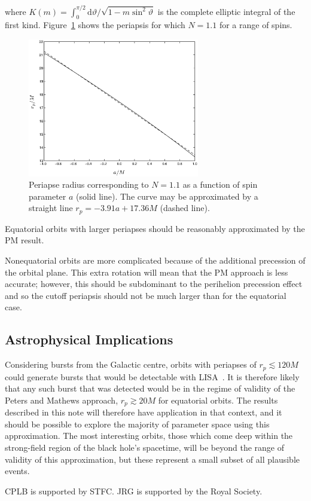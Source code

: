 \documentclass[aps,prd,amsfonts,amssymb,amsmath,nofootinbib,floatfix,reprint,showpacs,groupedaddress]{revtex4-1}
\newcommand{\Figref}[1]{Figure~\ref{fig:#1}}
\newcommand{\dd}{\ensuremath{\mathrm{d}}}
\begin{document}
where $K(m) = \int_{0}^{\pi/2}{\dd\vartheta/\sqrt{1-m\sin^2\vartheta}}$ is the complete elliptic integral of the first kind. \Figref{N_peri} shows the periapsis for which $N = 1.1$ for a range of spins.
\begin{figure}
\includegraphics[width=75mm]{N_peri_3.eps}
\caption{Periapse radius corresponding to $N = 1.1$ as a function of spin parameter $a$ (solid line). The curve may be approximated by a straight line $r_{p} = -3.91 a + 17.36M$ (dashed line).\label{fig:N_peri}}
\end{figure}
Equatorial orbits with larger periapses should be reasonably approximated by the PM result.

Nonequatorial orbits are more complicated because of the additional precession of the orbital plane. This extra rotation will mean that the PM approach is less accurate; however, this should be subdominant to the perihelion precession effect and so the cutoff periapsis should not be much larger than for the equatorial case.

\subsection{Astrophysical Implications}

Considering bursts from the Galactic centre, orbits with periapses of $r_{p} \lesssim 120 M$ could generate bursts that would be detectable with LISA~\cite{Rubbo2006, Hopman2007}. It is therefore likely that any such burst that was detected would be in the regime of validity of the Peters and Mathews approach, $r_{p} \gtrsim 20 M$ for equatorial orbits. The results described in this note will therefore have application in that context, and it should be possible to explore the majority of parameter space using this approximation. The most interesting orbits, those which come deep within the strong-field region of the black hole's spacetime, will be beyond the range of validity of this approximation, but these represent a small subset of all plausible events.

\begin{acknowledgments}
CPLB is supported by STFC. JRG is supported by the Royal Society.
\end{acknowledgments}


\end{document}
